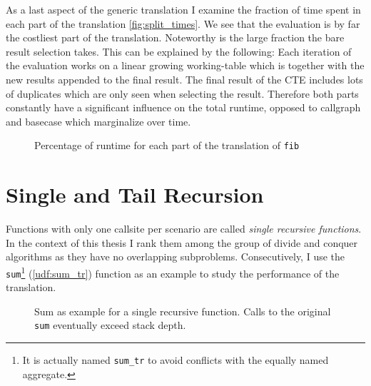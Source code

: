 As a last aspect of the generic translation I examine the fraction of time spent in each part of the translation \autoref{fig:split_times}. We see that the evaluation is by far the costliest part of the translation. Noteworthy is the large fraction the bare result selection takes. This can be explained by the following: Each iteration of the evaluation works on a linear growing working-table which is together with the new results appended to the final result. The final result of the CTE includes lots of duplicates which are only seen when selecting the result. Therefore both parts constantly have a significant influence on the total runtime, opposed to callgraph and basecase which marginalize over time.

\begin{figure}[h!]
    \centering\small
    
    \caption{Percentage of runtime for each part of the translation of \texttt{fib}}
    \label{fig:split_times}
\end{figure}


\iffalse
\begin{figure}[h]
    \centering\small
    
    \caption{Impact of the number of scenarios on the runtime. Single recursive function with expensive predicates}
    \label{fig:recn_times}
\end{figure}

Impact of number of scenarios (Overhead by predicates) \autoref{fig:recn_times}

\fi




\section{Single and Tail Recursion}

Functions with only one callsite per scenario are called \textit{single recursive functions}. In the context of this thesis I rank them among the group of divide and conquer algorithms as they have no overlapping subproblems. Consecutively, I use the \texttt{sum}\footnote{It is actually named \texttt{sum\_tr} to avoid conflicts with the equally named aggregate.} (\autoref{udf:sum_tr}) function as an example to study the performance of the translation.

\begin{figure}[h!]
    \centering\small
    
    \caption{Sum as example for a single recursive function. Calls to the original \texttt{sum} eventually exceed stack depth.}
    \label{fig:factorial_times}
\end{figure}


